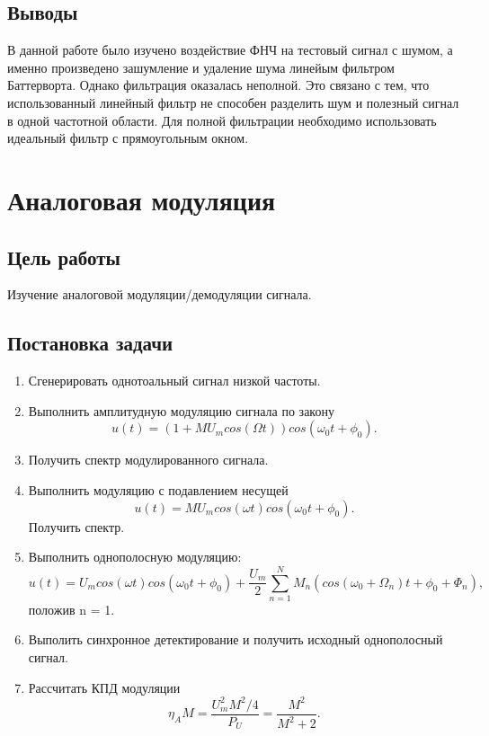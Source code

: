 \documentclass[10pt,a4paper]{article}
\begin{document}
\FloatBarrier

\subsection{Выводы}
В данной работе было изучено воздействие ФНЧ на тестовый сигнал с шумом, а именно произведено зашумление и удаление шума линейым фильтром Баттерворта. Однако фильтрация оказалась неполной. Это связано с тем, что использованный линейный фильтр не способен разделить шум и полезный сигнал в одной частотной области. Для полной фильтрации необходимо использовать идеальный фильтр с прямоугольным окном.

\newpage
\section{Аналоговая модуляция}

\subsection{Цель работы}
Изучение аналоговой модуляции/демодуляции сигнала.

\subsection{Постановка задачи}
	\begin{enumerate}
		\item Сгенерировать однотоальный сигнал низкой частоты.
		\item Выполнить амплитудную модуляцию сигнала по закону
				\begin{equation}
					u(t) = (1+MU_m cos(\Omega t))cos(\omega_0 t+\phi_0).
				\end{equation}
		\item Получить спектр модулированного сигнала.
		\item Выполнить модуляцию с подавлением несущей 
				\begin{equation}
					u(t) = MU_m cos(\omega t)cos(\omega_0 t+\phi_0).
				\end{equation}
		      Получить спектр. 
		\item Выполнить однополосную модуляцию:
				\begin{equation}
					u(t) = U_m cos(\omega t)cos(\omega_0 t+\phi_0)+\frac{U_m}{2}\sum_{n=1}^N M_n (cos(\omega_0 + \Omega_n )t + \phi_0 + \Phi_n ),
				\end{equation}
				положив n = 1.
		\item Выполить синхронное детектирование и получить исходный однополосный сигнал.
		\item Рассчитать КПД модуляции
				\begin{equation}
					\eta_A M = \frac{U_m ^2 M^2 /4}{P_U} = \frac{M^2}{M^2 + 2}.
				\end{equation}
	\end{enumerate}
\end{document}
